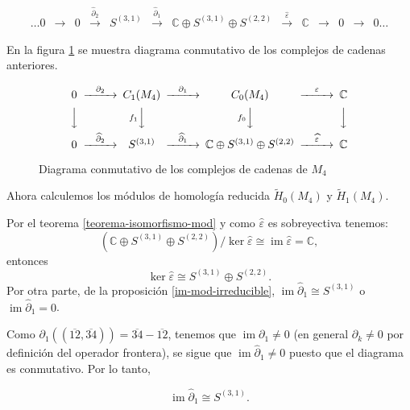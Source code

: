 \documentclass[12pt]{book}
\theoremstyle{definition}
\DeclareMathOperator{\im}{im}
\newcounter{in}
\newcounter{ini}
\begin{document}
\begin{small}
    \[
    \begin{array}{ccccccccccccc}
      \dots 0 & \rightarrow & 0 &
      \stackrel{\widehat\partial_{2}}{\rightarrow} &  S^{(3,1)} &
      \stackrel{\widehat\partial_{1}}{\rightarrow} & \mathbb{C} \oplus
      S^{(3,1)}\oplus S^{(2,2)} & \stackrel{\widehat\varepsilon}{\rightarrow} &
      \mathbb{C} & \rightarrow  & 0 & \rightarrow & 0 \dots
    \end{array} 
    \]
  \end{small}

En la figura \ref{fig:diagrama-conmutativo4} se muestra diagrama
conmutativo de los complejos de cadenas anteriores.
\begin{figure}[!hbtp]
  \centering
  \[
  \begin{CD}
    0 @>{\partial_{2}}>> C_{1}(M_{4}) @>{\partial_{1}}>> C_{0}(M_{4}) @>{\varepsilon}>> \mathbb{C}\\
    @VVV   @V{f_{1}}VV   @V{f_{0}}VV   @VVV    \\
    0 @>{\widehat\partial_{2}}>> S^{(3,1)} @>{\widehat\partial_{1}}>>
    \mathbb{C} \oplus S^{(3,1)}\oplus S^{(2,2)} @>{\widehat
      \varepsilon}>> \mathbb{C}
  \end{CD}
  \]
  
  \caption{Diagrama conmutativo de los complejos de cadenas de $M_{4}$}
\label{fig:diagrama-conmutativo4}
\end{figure}

Ahora calculemos los módulos de homología reducida $\widetilde H_{0}(M_{4})$ y
$\widetilde H_{1}(M_{4})$.

Por el teorema \ref{teorema-isomorfismo-mod} y como
$\widehat\varepsilon$ es sobreyectiva tenemos:
$$(\mathbb{C} \oplus S^{(3,1)}\oplus S^{(2,2)})/\ker\widehat\varepsilon\cong\im\widehat\varepsilon=\mathbb{C},$$
entonces
\begin{equation}
\label{ker-0-4}
\ker\widehat\varepsilon\cong S^{(3,1)}\oplus S^{(2,2)}.
\end{equation}
Por otra parte, de la proposición \ref{im-mod-irreducible}, $\im\widehat\partial_{1}\cong S^{(3,1)}$ o $\im\widehat\partial_{1}=0$.

Como $\partial_{1}((\overline{12},\overline{34}))=\overline{34}-\overline{12}$,
tenemos que $\im\partial_{1}\neq 0$ (en general $\partial_{k}\neq 0$
por definición del operador frontera), se sigue que
$\im\widehat\partial_{1}\neq 0$ puesto que el diagrama es
conmutativo. Por lo tanto, 

\begin{equation}
  \label{im-1-4}
  \im\widehat\partial_{1}\cong S^{(3,1)}.
\end{equation}
\end{document}
